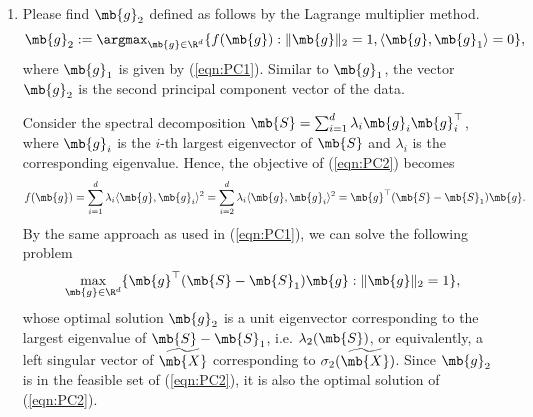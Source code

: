 \begin{exercise}
\begin{enumerate}
        \item Please find $\mb{g}_2$ defined as follows by the Lagrange multiplier method.
            \begin{align}\label{eqn:PC2}
                \mb{g}_2:=\argmax_{\mb{g}\in\R^d}\{f(\mb{g}):\|\mb{g}\|_2=1,\langle\mb{g},\mb{g}_1\rangle=0\},
            \end{align}
            where $\mb{g}_1$ is given by (\ref{eqn:PC1}). Similar to $\mb{g}_1$, the vector $\mb{g}_2$ is the second principal component vector of the data.
            \begin{solution}
                Consider the spectral decomposition $\mb{S} = \sum_{i=1}^d \lambda_i \mb{g}_i \mb{g}_i^\top$, where $\mb{g}_i$ is the $i$-th largest eigenvector of $\mb{S}$ and $\lambda_i$ is the corresponding eigenvalue. Hence, the objective of (\ref{eqn:PC2}) becomes
                \begin{align*}
                    f(\mb{g}) = \sum_{i=1}^d \lambda_i \langle\mb{g}, \mb{g}_i \rangle^2 = \sum_{i=2}^d \lambda_i \langle\mb{g}, \mb{g}_i \rangle^2 = \mb{g}^\top (\mb{S} - \mb{S}_1) \mb{g}.
                \end{align*}
                By the same approach as used in (\ref{eqn:PC1}), we can solve the following problem
                \begin{align*}
                    \max_{\mb{g}\in\R^d} \{\mb{g}^\top (\mb{S} - \mb{S}_1) \mb{g}: \|\mb{g}\|_2 = 1\},
                \end{align*}
                whose optimal solution $\mb{g}_2$ is a unit eigenvector corresponding to the largest eigenvalue of $\mb{S} - \mb{S}_1$, i.e. $\lambda_2(\mb{S})$, or equivalently, a left singular vector of $\widetilde{\mb{X}}$ corresponding to $\sigma_2(\widetilde{\mb{X}})$. Since $\mb{g}_2$ is in the feasible set of (\ref{eqn:PC2}), it is also the optimal solution of (\ref{eqn:PC2}).
                \qedhere
            \end{solution}


\end{enumerate}
\end{exercise}
